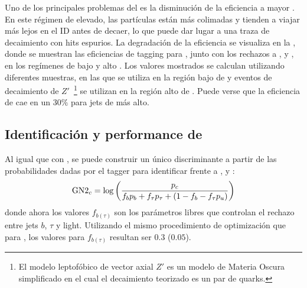 Uno de los principales problemas del \btagging es la disminución de la eficiencia a mayor \pt. En este régimen de \pt elevado, las partículas est\'an m\'as colimadas y tienden a viajar más lejos en el \ac{ID} antes de decaer, lo que puede dar lugar a una traza de decaimiento con hits espurios. La degradación de la eficiencia se visualiza en la \Tab{\ref{tab:objects:ftag:btag_efficiency_original}}, donde se muestran las eficiencias de tagging para \bjets, junto con los rechazos a \cjets, \ljets y \tjets, en los regímenes de bajo y alto \pt. Los valores mostrados se calculan utilizando diferentes muestras, en las que \ttbar se utiliza en la región bajo de \pt y eventos de decaimiento de \(Z'\)~\footnote{El modelo leptof\'obico de vector axial \(Z'\) es un modelo de Materia Oscura simplificado en el cual el decaimiento teorizado es un par de quarks.} se utilizan en la región alto de \pt. Puede verse que la eficiencia de \btag cae en un \(30\%\) para jets de \pt más alto.

\begin{table}[ht!]
    \caption{Medidas de eficiencias de \btagging, y de rechazos de \cjets, \ljets y \tjets, en los regímenes de bajo y alto \pt.}
    \label{tab:objects:ftag:btag_efficiency_original}
\end{table}

\subsection{Identificaci\'on y performance de \ctagging}

Al igual que con \btagging, se puede construir un único discriminante a partir de las probabilidades dadas por el tagger para identificar \cjets frente a \bjets, \tjets y \ljets:
\begin{equation}
    \text{GN2}_{c} = \log \left(
        \frac{p_c}{f_b p_b + f_{\tau} p_{\tau} + \left(1-f_b-f_{\tau}p_u\right)}
    \right)
\end{equation}
donde ahora los valores \(f_{b(\tau)}\) son los parámetros libres que controlan el rechazo entre jets \(b\), \(\tau\) y light. Utilizando el mismo procedimiento de optimización que para \btagging, los valores para \(f_{b(\tau)}\) resultan ser \(0.3\) (\(0.05\)).

